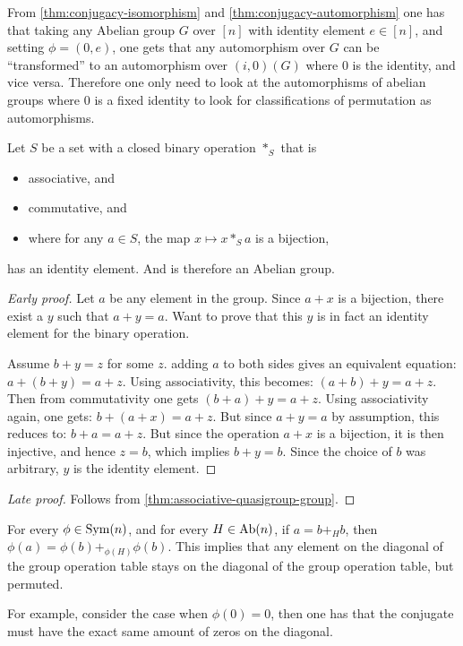 \begin{remark}
    From \autoref{thm:conjugacy-isomorphism} and \autoref{thm:conjugacy-automorphism} one has that taking any Abelian group \( G \) over \( [n] \) with identity element \( e \in [n] \), and setting \( \phi = (0, e) \), one gets that any automorphism over \( G \) can be ``transformed'' to an automorphism over \( (i, 0)(G) \) where \( 0 \) is the identity, and vice versa. Therefore one only need to look at the automorphisms of abelian groups where \( 0 \) is a fixed identity to look for classifications of permutation as automorphisms.
\end{remark}

\begin{theorem}
    Let \( S \) be a set with a closed binary operation \( *_S \) that is
    \begin{itemize}
        \item associative, and
        \item commutative, and
        \item where for any \( a \in S \), the map \( x \mapsto x *_S a \) is a bijection,
    \end{itemize}
    has an identity element. And is therefore an Abelian group.
\end{theorem}
\begin{proof}[Early proof]
    Let \( a \) be any element in the group. Since \( a + x \) is a bijection, there exist a \( y \) such that \( a + y = a \). Want to prove that this \( y \) is in fact an identity element for the binary operation.

    Assume \( b + y = z\) for some \( z \). adding \( a \) to both sides gives an equivalent equation: \( a + (b + y) = a + z \). Using associativity, this becomes: \( (a + b) + y = a + z \). Then from commutativity one gets \( (b + a) + y = a + z \). Using associativity again, one gets: \( b + (a + x) = a + z\). But since \( a + y = a \) by assumption, this reduces to: \( b + a = a + z \). But since the operation \( a + x\) is a bijection, it is then injective, and hence \( z = b \), which implies \( b + y = b\). Since the choice of \( b \) was arbitrary, \( y \) is the identity element.
\end{proof}
\begin{proof}[Late proof]
    Follows from \autoref{thm:associative-quasigroup-group}.
\end{proof}

\begin{remark}
    For every \( \phi \in \operatorname{Sym}(n) \), and for every \( H \in \operatorname{Ab}(n) \), if \( a = b +_H b \), then \( \phi(a) = \phi(b) +_{\phi(H)} \phi(b) \). This implies that any element on the diagonal of the group operation table stays on the diagonal of the group operation table, but permuted.

    For example, consider the case when \( \phi(0) = 0 \), then one has that the conjugate must have the exact same amount of zeros on the diagonal.
\end{remark}

